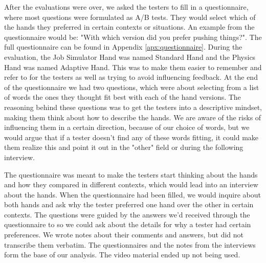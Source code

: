 After the evaluations were over, we asked the testers to fill in a questionnaire, where most questions were formulated as A/B tests. They would select which of the hands they preferred in certain contexts or situations. An example from the questionnaire would be: "With which version did you prefer pushing things?". The full questionnaire can be found in Appendix \ref{apx:questionnaire}. During the evaluation, the Job Simulator Hand was named Standard Hand and the Physics Hand was named Adaptive Hand. This was to make them easier to remember and refer to for the testers as well as trying to avoid influencing feedback. At the end of the questionnaire we had two questions, which were about selecting from a list of words the ones they thought fit best with each of the hand versions. The reasoning behind these questions was to get the testers into a descriptive mindset, making them think about how to describe the hands. We are aware of the risks of influencing them in a certain direction, because of our choice of words, but we would argue that if a tester doesn't find any of these words fitting, it could make them realize this and point it out in the "other" field or during the following interview.

The questionnaire was meant to make the testers start thinking about the hands and how they compared in different contexts, which would lead into an interview about the hands. When the questionnaire had been filled, we would inquire about both hands and ask why the tester preferred one hand over the other in certain contexts. The questions were guided by the answers we'd received through the questionnaire to so we could ask about the details for why a tester had certain preferences. We wrote notes about their comments and answers, but did not transcribe them verbatim. The questionnaires and the notes from the interviews form the base of our analysis. The video material ended up not being used.

\begin{table}[h]
\centering
\caption{Test procedure for the user evaluations.}
\label{tab:testProcedure}
\end{table}

